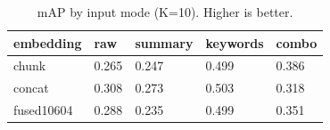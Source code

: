 \begin{table}
\caption{mAP by input mode (K=10). Higher is better.}
\label{tab:map-by-mode}
\begin{tabular}{lllll}
\toprule
embedding & raw & summary & keywords & combo \\
\midrule
chunk & 0.265 & 0.247 & 0.499 & 0.386 \\
concat & 0.308 & 0.273 & 0.503 & 0.318 \\
fused10604 & 0.288 & 0.235 & 0.499 & 0.351 \\
\bottomrule
\end{tabular}
\end{table}
